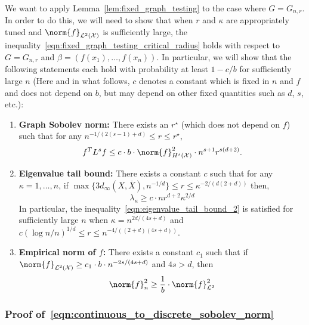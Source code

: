 \documentclass{article}
\newcommand{\1}{\mathbf{1}}
\newcommand{\Xset}{\mathcal{X}}
\newcommand{\Leb}{\mathcal{L}}
\newcommand{\ol}[1]{\overline{#1}}
\theoremstyle{alden}
\theoremstyle{aldenthm}
\theoremstyle{definition}
\theoremstyle{remark}
\begin{document}
We want to apply Lemma~\ref{lem:fixed_graph_testing} to the case where $G = G_{n,r}$. In order to do this, we will need to show that when $r$ and $\kappa$ are appropriately tuned and $\norm{f}_{\Leb^2(\mathcal{X})}$ is sufficiently large, the inequality~\eqref{eqn:fixed_graph_testing_critical_radius} holds with respect to $G = G_{n,r}$ and $\beta = (f(x_1),\ldots,f(x_n))$. In particular, we will show that the following statements each hold with probability at least $1 - c/b$ for sufficiently large $n$ (Here and in what follows, $c$ denotes a constant which is fixed in $n$ and $f$ and does not depend on $b$, but may depend on other fixed quantities such as $d$, $s$, etc.): 
\begin{enumerate}[label=(E\arabic*)]
	\item 
	\label{event:discrete_sobolev_norm}
	\textbf{Graph Sobolev norm:} There exists an $r^{\star}$ (which does not depend on $f$) such that for any $n^{-1/(2(s - 1) + d)}\leq r \leq r^{\star}$,
	\begin{equation}
	\label{eqn:continuous_to_discrete_sobolev_norm}
	f^T L^s f \leq c \cdot b \cdot \norm{f}_{H^s(\Xset)}^2 \cdot n^{s + 1} r^{s(d + 2)}.
	\end{equation}
	\item 
	\label{event:eigenvalue_tail_decay_2}
	\textbf{Eigenvalue tail bound:} There exists a constant $c$ such that for any $\kappa = 1,\ldots,n$, if $\max\{ 3 d_{\infty}(X,\ol{X}),n^{-1/d}\} \leq r \leq \kappa^{-2/(d(2 +d))}$ then,
	\begin{equation}
	\label{eqn:eigenvalue_tail_bound_2}
	\lambda_{\kappa} \geq c \cdot n r^{d + 2} \kappa^{2/d}
	\end{equation}
	In particular, the inequality~\eqref{eqn:eigenvalue_tail_bound_2} is satisfied for sufficiently large $n$ when $\kappa = n^{2d/(4s + d)}$ and $c(\log n/n)^{1/d} \leq r \leq n^{-4/((2+d)(4s + d))}$. 
	\item 
	\label{event:l2_norm_order1}
	\textbf{Empirical norm of $f$:} There exists a constant $c_1$ such that if $\norm{f}_{\Leb^2(\Xset)} \geq c_1 \cdot b \cdot n^{-2s/(4s + d)}$ and $4s > d$, then
	\begin{equation}
	\label{eqn:l2_to_empirical_norm_order1}
	\norm{f}_n^2 \geq \frac{1}{b} \cdot \norm{f}_{\Leb^2}^2
	\end{equation}
\end{enumerate} 

\subsubsection{Proof of~\eqref{eqn:continuous_to_discrete_sobolev_norm}}
\end{document}
